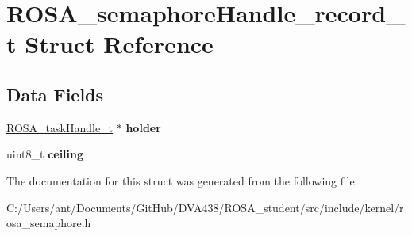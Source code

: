 \hypertarget{struct_r_o_s_a__semaphore_handle__record__t}{}\section{R\+O\+S\+A\+\_\+semaphore\+Handle\+\_\+record\+\_\+t Struct Reference}
\label{struct_r_o_s_a__semaphore_handle__record__t}
\subsection*{Data Fields}
\begin{DoxyCompactItemize}
\item 
\mbox{\label{struct_r_o_s_a__semaphore_handle__record__t_aee44fde3d840181bcc9a8f4f85e32302}} 
\mbox{\hyperlink{rosa__def_8h_a82d32f422c2987044e833843e7620aa6}{R\+O\+S\+A\+\_\+task\+Handle\+\_\+t}} $\ast$ {\bfseries holder}
\item 
\mbox{\label{struct_r_o_s_a__semaphore_handle__record__t_aeae41d9c3a19d945957a534257e30792}} 
uint8\+\_\+t {\bfseries ceiling}
\end{DoxyCompactItemize}


The documentation for this struct was generated from the following file\+:\begin{DoxyCompactItemize}
\item 
C\+:/\+Users/ant/\+Documents/\+Git\+Hub/\+D\+V\+A438/\+R\+O\+S\+A\+\_\+student/src/include/kernel/rosa\+\_\+semaphore.\+h\end{DoxyCompactItemize}
